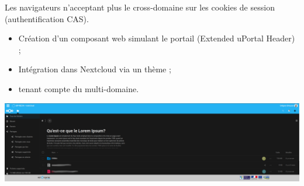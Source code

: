 \begin{frame}{\sub}
Les navigateurs n'acceptant plus le cross-domaine sur les cookies de session (authentification CAS).
\begin{itemize}
	\item Création d'un composant web simulant le portail (Extended uPortal Header) ;
	\item Intégration dans Nextcloud via un thème ;
	\item tenant compte du multi-domaine.  
\end{itemize}
\includegraphics[width=\textwidth]{extended-uportal-header.png}
\end{frame}
